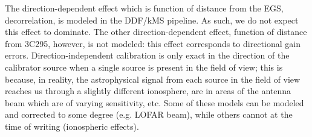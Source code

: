 \pg
The direction-dependent effect which is function of distance from the EGS, decorrelation, is modeled in the DDF/kMS pipeline. As such, we do not expect this effect to dominate. The other direction-dependent effect, function of distance from 3C295, however, is not modeled: this effect corresponds to directional gain errors. Direction-independent calibration is only exact in the direction of the calibrator source when a single source is present in the field of view; this is because, in reality, the astrophysical signal from each source in the field of view reaches us through a slightly different ionosphere, are in areas of the antenna beam which are 
of varying sensitivity, etc. Some of these models can be modeled and corrected to some degree (e.g. LOFAR beam), while others cannot at the time of writing (ionospheric effects). 
%

